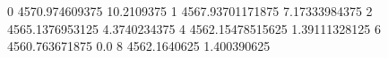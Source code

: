 0 4570.974609375 10.2109375
1 4567.93701171875 7.17333984375
2 4565.1376953125 4.3740234375
4 4562.15478515625 1.39111328125
6 4560.763671875 0.0
8 4562.1640625 1.400390625
